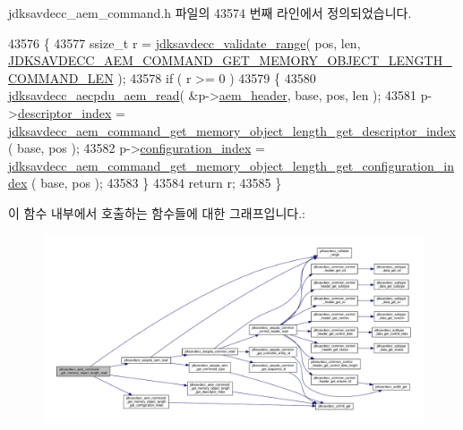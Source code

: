 jdksavdecc\+\_\+aem\+\_\+command.\+h 파일의 43574 번째 라인에서 정의되었습니다.


\begin{DoxyCode}
43576 \{
43577     ssize\_t r = \hyperlink{group__util_ga9c02bdfe76c69163647c3196db7a73a1}{jdksavdecc\_validate\_range}( pos, len, 
      \hyperlink{group__command__get__memory__object__length_gadecd0d8e632fe8a8f6bb6f28b059b0dd}{JDKSAVDECC\_AEM\_COMMAND\_GET\_MEMORY\_OBJECT\_LENGTH\_COMMAND\_LEN}
       );
43578     \textcolor{keywordflow}{if} ( r >= 0 )
43579     \{
43580         \hyperlink{group__aecpdu__aem_gae2421015dcdce745b4f03832e12b4fb6}{jdksavdecc\_aecpdu\_aem\_read}( &p->\hyperlink{structjdksavdecc__aem__command__get__memory__object__length_ae1e77ccb75ff5021ad923221eab38294}{aem\_header}, base, pos, len );
43581         p->\hyperlink{structjdksavdecc__aem__command__get__memory__object__length_a042bbc76d835b82d27c1932431ee38d4}{descriptor\_index} = 
      \hyperlink{group__command__get__memory__object__length_ga91ac697db77b7a0ce5a223a9e879a5a4}{jdksavdecc\_aem\_command\_get\_memory\_object\_length\_get\_descriptor\_index}
      ( base, pos );
43582         p->\hyperlink{structjdksavdecc__aem__command__get__memory__object__length_afaad1bd7c66f9611e134d8c5ce98f444}{configuration\_index} = 
      \hyperlink{group__command__get__memory__object__length_ga4355991c4c60807bc7b75ae37f167028}{jdksavdecc\_aem\_command\_get\_memory\_object\_length\_get\_configuration\_index}
      ( base, pos );
43583     \}
43584     \textcolor{keywordflow}{return} r;
43585 \}
\end{DoxyCode}


이 함수 내부에서 호출하는 함수들에 대한 그래프입니다.\+:
\nopagebreak
\begin{figure}[H]
\begin{center}
\leavevmode
\includegraphics[width=350pt]{group__command__get__memory__object__length_ga9a8f725287029f2ef559ce8ba7fc5965_cgraph}
\end{center}
\end{figure}


